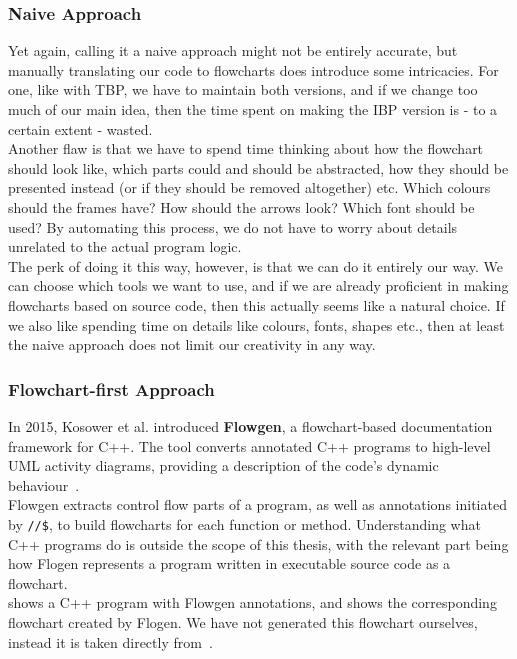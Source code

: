\subsubsection{Naive Approach}

Yet again, calling it a naive approach might not be entirely accurate, but manually translating our code to flowcharts does introduce some intricacies. For one, like with TBP, we have to maintain both versions, and if we change too much of our main idea, then the time spent on making the IBP version is - to a certain extent - wasted. \\

Another flaw is that we have to spend time thinking about how the flowchart should look like, which parts could and should be abstracted, how they should be presented instead (or if they should be removed altogether) etc. Which colours should the frames have? How should the arrows look? Which font should be used? By automating this process, we do not have to worry about details unrelated to the actual program logic. \\

The perk of doing it this way, however, is that we can do it entirely our way. We can choose which tools we want to use, and if we are already proficient in making flowcharts based on source code, then this actually seems like a natural choice. If we also like spending time on details like colours, fonts, shapes etc., then at least the naive approach does not limit our creativity in any way.

\subsubsection{Flowchart-first Approach}

In 2015, Kosower et al. introduced \textbf{Flowgen}, a flowchart-based documentation framework for C++. The tool converts annotated C++ programs to high-level UML activity diagrams, providing a description of the code's dynamic behaviour~\cite{flowgen}. \\

Flowgen extracts control flow parts of a program, as well as annotations initiated by \texttt{//\$}, to build flowcharts for each function or method. Understanding what C++ programs do is outside the scope of this thesis, with the relevant part being how Flogen represents a program written in executable source code as a flowchart. \\

 shows a C++ program with Flowgen annotations, and  shows the corresponding flowchart created by Flogen. We have not generated this flowchart ourselves, instead it is taken directly from~\cite{flowgen}. \\

